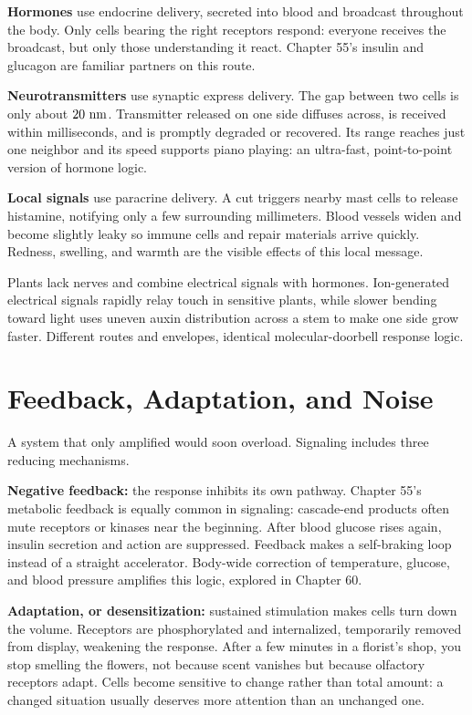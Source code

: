 \textbf{Hormones} use endocrine delivery, secreted into blood and broadcast throughout the body. Only cells bearing the right receptors respond: everyone receives the broadcast, but only those understanding it react. Chapter 55's insulin and glucagon are familiar partners on this route.

\textbf{Neurotransmitters} use synaptic express delivery. The gap between two cells is only about $20\ \mathrm{nm}$. Transmitter released on one side diffuses across, is received within milliseconds, and is promptly degraded or recovered. Its range reaches just one neighbor and its speed supports piano playing: an ultra-fast, point-to-point version of hormone logic.

\textbf{Local signals} use paracrine delivery. A cut triggers nearby mast cells to release histamine, notifying only a few surrounding millimeters. Blood vessels widen and become slightly leaky so immune cells and repair materials arrive quickly. Redness, swelling, and warmth are the visible effects of this local message.

Plants lack nerves and combine electrical signals with hormones. Ion-generated electrical signals rapidly relay touch in sensitive plants, while slower bending toward light uses uneven auxin distribution across a stem to make one side grow faster. Different routes and envelopes, identical molecular-doorbell response logic.

\section{Feedback, Adaptation, and Noise}

A system that only amplified would soon overload. Signaling includes three reducing mechanisms.

\textbf{Negative feedback:} the response inhibits its own pathway. Chapter 55's metabolic feedback is equally common in signaling: cascade-end products often mute receptors or kinases near the beginning. After blood glucose rises again, insulin secretion and action are suppressed. Feedback makes a self-braking loop instead of a straight accelerator. Body-wide correction of temperature, glucose, and blood pressure amplifies this logic, explored in Chapter 60.

\textbf{Adaptation, or desensitization:} sustained stimulation makes cells turn down the volume. Receptors are phosphorylated and internalized, temporarily removed from display, weakening the response. After a few minutes in a florist's shop, you stop smelling the flowers, not because scent vanishes but because olfactory receptors adapt. Cells become sensitive to change rather than total amount: a changed situation usually deserves more attention than an unchanged one.

